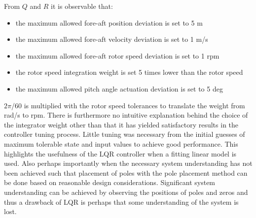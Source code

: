 From $ Q $ and $ R $ it is observable that:
\begin{itemize}
	\item the maximum allowed fore-aft position deviation is set to 5 m
	\item the maximum allowed fore-aft velocity deviation is set to 1 m/s
	\item the maximum allowed fore-aft rotor speed deviation is set to 1 rpm
	\item the rotor speed integration weight is set 5 times lower than the rotor speed
	\item the maximum allowed pitch angle actuation deviation is set to 5 deg
\end{itemize}
$ 2 \pi $/$ 60 $ is multiplied with the rotor speed tolerances to translate the weight from rad/s to rpm. There is furthermore no intuitive explanation behind the choice of the integrator weight other than that it has yielded satisfactory results in the controller tuning process. Little tuning was necessary from the initial guesses of maximum tolerable state and input values to achieve good performance. This highlights the usefulness of the LQR controller when a fitting linear model is used. Also perhaps importantly when the necessary system understanding has not been achieved such that placement of poles with the pole placement method can be done based on reasonable design considerations. Significant system understanding can be achieved by observing the positions of poles and zeros and thus a drawback of LQR is perhaps that some understanding of the system is lost.






